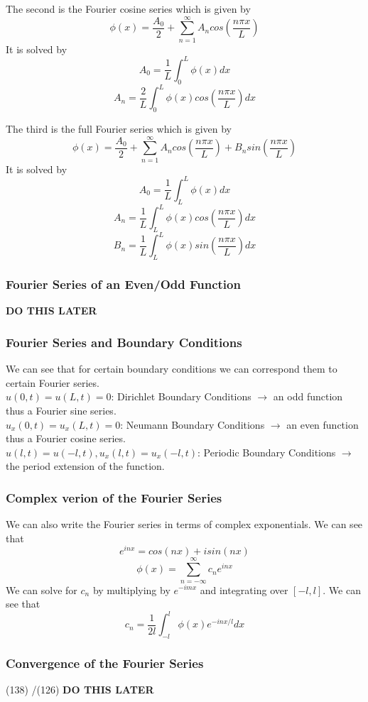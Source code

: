 \documentclass[answers,12pt,addpoints]{exam}
\begin{document}
    The second is the Fourier cosine series which is given by
    $$ \phi(x) = \frac{A_0}{2} + \sum_{n=1}^{\infty} A_n cos(\frac{n \pi x}{L})$$
    It is solved by
    $$ A_0 = \frac{1}{L} \int_{0}^{L} \phi(x) dx$$
    $$ A_n = \frac{2}{L} \int_{0}^{L} \phi(x) cos(\frac{n \pi x}{L}) dx$$

    The third is the full Fourier series which is given by
    $$ \phi(x) = \frac{A_0}{2} + \sum_{n=1}^{\infty} A_n cos(\frac{n \pi x}{L}) + B_n sin(\frac{n \pi x}{L})$$
    It is solved by
    $$ A_0 = \frac{1}{L} \int_{L}^{L} \phi(x) dx$$
    $$ A_n = \frac{1}{L} \int_{L}^{L} \phi(x) cos(\frac{n \pi x}{L}) dx$$
    $$ B_n = \frac{1}{L} \int_{L}^{L} \phi(x) sin(\frac{n \pi x}{L}) dx$$

    \subsubsection{Fourier Series of an Even/Odd Function}
    \textbf{DO THIS LATER}

    \subsubsection{Fourier Series and Boundary Conditions}
    We can see that for certain boundary conditions we can correspond them to certain Fourier series.\\
    $u(0,t) = u(L,t) = 0$: Dirichlet Boundary Conditions $\to$ an odd function thus a Fourier sine series.\\
    $u_x(0,t) = u_x(L,t) = 0$: Neumann Boundary Conditions $\to$ an even function thus a Fourier cosine series.\\
    $u(l,t) =  u(-l,t), u_x(l,t) = u_x(-l,t)$: Periodic Boundary Conditions $\to$ the period extension of the function.\\

    \subsubsection{Complex verion of the Fourier Series}
    We can also write the Fourier series in terms of complex exponentials. We can see that
    $$ e^{inx} = cos(nx) + i sin(nx)$$
    $$ \phi(x) = \sum_{n=-\infty}^{\infty} c_n e^{inx}$$
    We can solve for $c_n$ by multiplying by $e^{-imx}$ and integrating over $[-l, l]$. We can see that
    $$ c_n = \frac{1}{2l} \int_{-l}^{l} \phi(x) e^{-inx/l} dx$$

    \subsubsection{Convergence of the Fourier Series}
    (138) /(126)
    \textbf{DO THIS LATER}
\end{document}
